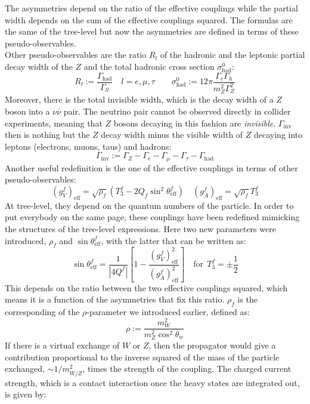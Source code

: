 \documentclass[../main.tex]{subfiles}
\begin{document}
The asymmetries depend on the ratio of the effective couplings while the partial width depends on the sum of the effective couplings squared. The formulas are the same of the tree-level but now the asymmetries are defined in terms of these pseudo-observables.\\ Other pseudo-observables are the ratio $R_l$ of the hadronic and the leptonic partial decay width of the $Z$ and the total hadronic cross section $\sigma_{\text{had}}^0$:
\[
R_l:=\frac{\Gamma_{\text{had}}}{\Gamma_{ll}} \quad l=e,\mu,\tau \qquad \sigma_{\text{had}}^0:=12\pi\frac{\Gamma_e\Gamma_h}{m_Z^2\Gamma_Z^2}
\]
Moreover, there is the total invisible width, which is the decay width of a $Z$ boson into a $\nu\overline{\nu}$ pair. The neutrino pair cannot be observed directly in collider experiments, meaning that $Z$ bosons decaying in this fashion are \textit{invisible}. $\Gamma_{\text{inv}}$ then is nothing but the $Z$ decay width minus the visible width of $Z$ decaying into leptons (electrons, muons, taus) and hadrons:
\[
\Gamma_{\text{inv}}:=\Gamma_Z-\Gamma_e-\Gamma_\mu-\Gamma_\tau-\Gamma_{\text{had}}
\]
Another useful redefinition is the one of the effective couplings in terms of other pseudo-observables:
\[
(g_V^f)_{\text{eff}}=\sqrt{\rho_f}(T_3^f-2Q_f\sin^2\theta_{\text{eff}}^f) \quad (g_A^f)_{\text{eff}}=\sqrt{\rho_f}T_3^f
\]
At tree-level, they depend on the quantum numbers of the particle. In order to put everybody on the same page, these couplings have been redefined mimicking the structures of the tree-level expressions. Here two new parameters were introduced, $\rho_f$ and $\sin\theta_{\text{eff}}^f$, with the latter that can be written as:
\[
\sin\theta_{\text{eff}}^f=\frac{1}{|4Q^f|}\left[1-\frac{(g_V^f)_{\text{eff}}^2}{(g_A^f)_{\text{eff}}^2}\right] \quad \text{for}\,\;T_3^f=\pm\frac{1}{2}
\]
This depends on the ratio between the two effective couplings squared, which means it is a function of the asymmetries that fix this ratio. $\rho_f$ is the corresponding of the $\rho$-parameter we introduced earlier, defined as:
\[
\rho:=\frac{m_W^2}{m_Z^2\cos^2\theta_w}
\]
If there is a virtual exchange of $W$ or $Z$, then the propagator would give a contribution proportional to the inverse squared of the mass of the particle exchanged, $\sim1/m^2_{W/Z}$, times the strength of the coupling. The charged current strength, which is a contact interaction once the heavy states are integrated out, is given by:
\end{document}
